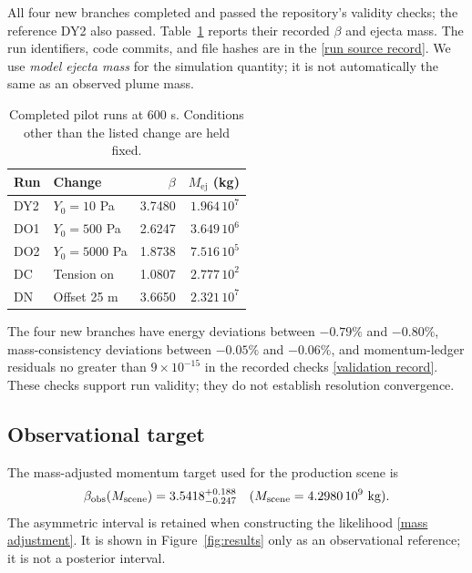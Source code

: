 \documentclass[10pt,twocolumn]{article}
\newcommand{\Yzero}{Y_0}
\newcommand{\Mej}{M_{\mathrm{ej}}}
\newcommand{\repo}[2]{\href{https://github.com/Yagiz-D-Ekrem-Dolar/dart-rift/blob/a35dab4/#1}{#2}}
\begin{document}
All four new branches completed and passed the repository's validity
checks; the reference DY2 also passed. Table~\ref{tab:runs} reports
their recorded $\beta$ and ejecta mass. The run identifiers, code
commits, and file hashes are in the
\repo{docs/olcumler/DO_DC_DN_2026-10-06/KAYNAK.md}{[run source record]}.
We use \emph{model ejecta mass} for the simulation quantity; it is not
automatically the same as an observed plume mass.

\begin{table}[t]
\centering
\caption{Completed pilot runs at 600 s. Conditions other than the
listed change are held fixed.}
\label{tab:runs}
\footnotesize
\begin{tabular}{@{}llrr@{}}
\toprule
Run & Change & $\beta$ & $\Mej$ (kg)\\
\midrule
DY2 & $\Yzero=10$ Pa & 3.7480 & $1.964\,10^7$\\
DO1 & $\Yzero=500$ Pa & 2.6247 & $3.649\,10^6$\\
DO2 & $\Yzero=5000$ Pa & 1.8738 & $7.516\,10^5$\\
DC & Tension on & 1.0807 & $2.777\,10^2$\\
DN & Offset 25 m & 3.6650 & $2.321\,10^7$\\
\bottomrule
\end{tabular}
\end{table}

The four new branches have energy deviations between $-0.79\%$
and $-0.80\%$, mass-consistency deviations between $-0.05\%$
and $-0.06\%$, and momentum-ledger residuals no greater than
$9\times10^{-15}$ in the recorded checks
\repo{docs/defter/KAYIT-076_2026-10-06_DO-DC-DN-uc-kilitli-yargi.md}{[validation record]}.
These checks support run validity; they do not establish
resolution convergence.

\subsection{Observational target}
The mass-adjusted momentum target used for the production scene is
\begin{equation}
\beta_{\mathrm{obs}}(M_{\mathrm{scene}})
=3.5418^{+0.188}_{-0.247}
\quad(M_{\mathrm{scene}}=4.2980\,10^9\ {\rm kg}).
\label{eq:betaobs}
\end{equation}
The asymmetric interval is retained when constructing the likelihood
\repo{docs/adr/ADR-0054-c1-gozlenen-beta-hangi-sayi.md}{[mass adjustment]}.
It is shown in Figure~\ref{fig:results} only as an observational
reference; it is not a posterior interval.
\end{document}
